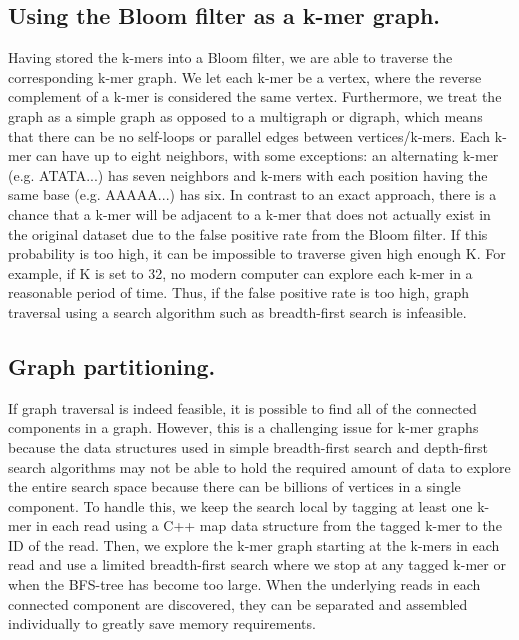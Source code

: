 \documentclass[12pt]{article} \usepackage{simplemargins}
\begin{document}
\subsection{Using the Bloom filter as a k-mer graph.}
Having stored the k-mers into a Bloom filter, we are able to traverse
the corresponding k-mer graph. We let each k-mer be a vertex, where
the reverse complement of a k-mer is considered the same
vertex. Furthermore, we treat the graph as a simple graph as opposed
to a multigraph or digraph, which means that there can be no
self-loops or parallel edges between vertices/k-mers. Each k-mer can
have up to eight neighbors, with some exceptions: an alternating k-mer
(e.g. ATATA...) has seven neighbors and k-mers with each position
having the same base (e.g. AAAAA...) has six. In contrast to an exact
approach, there is a chance that a k-mer will be adjacent to a k-mer
that does not actually exist in the original dataset due to the false
positive rate from the Bloom filter. If this probability is too high,
it can be impossible to traverse given high enough K. For example, if
K is set to 32, no modern computer can explore each k-mer in a
reasonable period of time. Thus, if the false positive rate is too
high, graph traversal using a search algorithm such as breadth-first
search is infeasible.

\subsection{Graph partitioning.}
If graph traversal is indeed feasible, it is possible to find all of
the connected components in a graph. However, this is a challenging
issue for k-mer graphs because the data structures used in simple
breadth-first search and depth-first search algorithms may not be able
to hold the required amount of data to explore the entire search space
because there can be billions of vertices in a single component. To
handle this, we keep the search local by tagging at least one k-mer in
each read using a C++ map data structure from the tagged k-mer to the
ID of the read. Then, we explore the k-mer graph starting at the
k-mers in each read and use a limited breadth-first search where we
stop at any tagged k-mer or when the BFS-tree has become too
large. When the underlying reads in each connected component are
discovered, they can be separated and assembled individually to
greatly save memory requirements.
\end{document}
